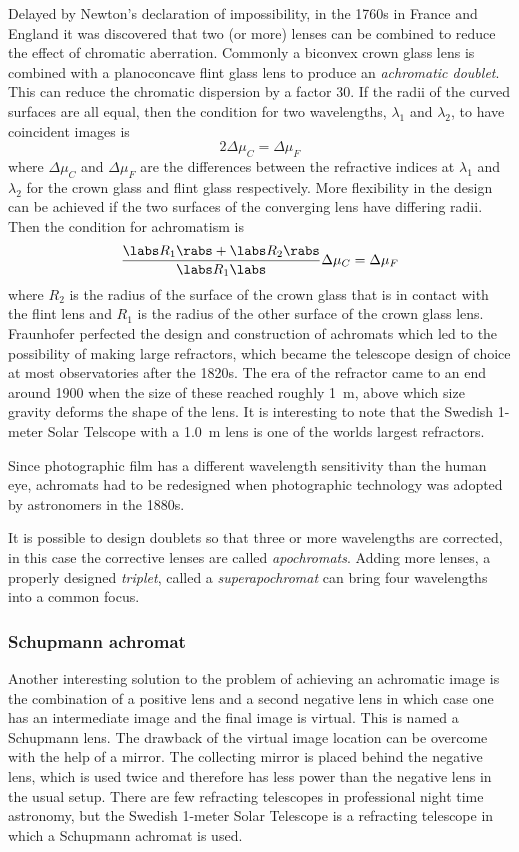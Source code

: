 Delayed by Newton's declaration of impossibility, in the 1760s in France 
and England it was discovered that 
two (or more) lenses can be combined to reduce the effect of chromatic 
aberration. Commonly a biconvex crown glass lens is combined with a 
planoconcave flint glass lens to produce an {\it achromatic doublet}. This can 
reduce the chromatic dispersion by a factor 30. If the radii of the 
curved surfaces are all equal, then the condition for two wavelengths,
$\lambda_1$ and $\lambda_2$, to have coincident images is 
\[
2\Delta\mu_C=\Delta\mu_F
\]
where $\Delta\mu_C$ and $\Delta\mu_F$ are the differences between the 
refractive indices at $\lambda_1$ and $\lambda_2$ for the crown glass and
flint glass respectively. More flexibility in the design can be achieved 
if the two surfaces of the converging lens have differing radii. Then the
condition for achromatism is
\[
{\labs R_1\rabs+\labs R_2\rabs\over\labs R_1\labs}\Delta\mu_C=\Delta\mu_F
\]
where $R_2$ is the radius of the surface of the crown glass that is in 
contact with the flint lens and $R_1$ is the radius of the other surface
of the crown glass lens. Fraunhofer perfected the design and construction
of achromats which led to the possibility of making large refractors, which became 
the telescope design of choice at most observatories after the 1820s.
The era of the refractor came to an end around 1900 when the size of these
reached roughly 1~m, above which size gravity deforms the shape of the lens. It is 
interesting to note that the Swedish 1-meter Solar Telscope with a 1.0~m lens is
one of the worlds largest refractors.

Since photographic film has a different wavelength sensitivity than the
human eye, achromats had to be redesigned when photographic technology 
was adopted by astronomers in the 1880s. 

It is possible to design doublets so that three or more wavelengths are corrected, in this
case the corrective lenses are called {\it apochromats}. Adding more lenses, a properly 
designed {\it triplet}, called a {\it superapochromat} can bring four wavelengths into 
a common focus.

\subsubsection{Schupmann achromat}

Another interesting solution to the problem of achieving an achromatic image
is the combination of a positive lens and a second negative lens in which case
one has an intermediate image and the final image is virtual. This is named
a Schupmann lens. The drawback of the virtual image location can be overcome
with the help of a mirror. The collecting mirror is placed behind the negative
lens, which is used twice and therefore has less power than the negative lens
in the usual setup. There are few refracting telescopes in professional night 
time astronomy, but the Swedish 1-meter Solar Telescope is a refracting 
telescope in which a Schupmann achromat is used.

